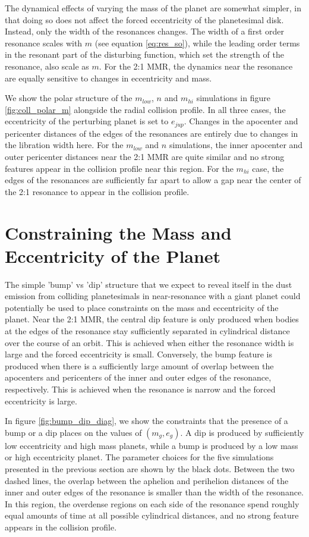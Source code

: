 \documentclass[onecolumn]{aastex63}
\begin{document}
The dynamical effects of varying the mass of the planet are somewhat simpler, in that doing so does not affect the forced eccentricity of the planetesimal disk. Instead, only the width of the resonances changes. The width of a first order resonance scales with $m$ (see equation \ref{eq:res_so}), while the leading order terms in the resonant part of the disturbing function, which set the strength of the resonance, also scale as $m$. For the 2:1 MMR, the dynamics near the resonance are equally sensitive to changes in eccentricity and mass.

We show the polar structure of the $m_{low}$, $n$ and $m_{hi}$ simulations in figure \ref{fig:coll_polar_m} alongside the radial collision profile. In all three cases, the eccentricity of the perturbing planet is set to $e_{jup}$. Changes in the apocenter and pericenter distances of the edges of the resonances are entirely due to changes in the libration width here. For the $m_{low}$ and $n$ simulations, the inner apocenter and outer pericenter distances near the 2:1 MMR are quite similar and no strong features appear in the collision profile near this region. For the $m_{hi}$ case, the edges of the resonances are sufficiently far apart to allow a gap near the center of the 2:1 resonance to appear in the collision profile.

\section{Constraining the Mass and Eccentricity of the Planet}

The simple 'bump' vs 'dip' structure that we expect to reveal itself in the dust emission from colliding planetesimals in near-resonance with a giant planet could potentially be used to place constraints on the mass and eccentricity of the planet. Near the 2:1 MMR, the central dip feature is only produced when bodies at the edges of the resonance stay sufficiently separated in cylindrical distance over the course of an orbit. This is achieved when either the resonance width is large and the forced eccentricity is small. Conversely, the bump feature is produced when there is a sufficiently large amount of overlap between the apocenters and pericenters of the inner and outer edges of the resonance, respectively. This is achieved when the resonance is narrow and the forced eccentricity is large.

In figure \ref{fig:bump_dip_diag}, we show the constraints that the presence of a bump or a dip places on the values of $(m_{g}, e_{g})$. A dip is produced by sufficiently low eccentricity and high mass planets, while a bump is produced by a low mass or high eccentricity planet. The parameter choices for the five simulations presented in the previous section are shown by the black dots. Between the two dashed lines, the overlap between the aphelion and perihelion distances of the inner and outer edges of the resonance is smaller than the width of the resonance. In this region, the overdense regions on each side of the resonance spend roughly equal amounts of time at all possible cylindrical distances, and no strong feature appears in the collision profile.
\end{document}
